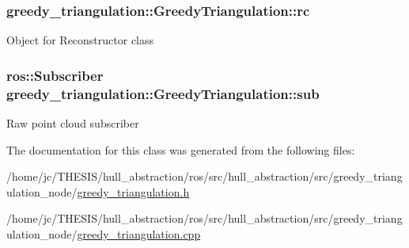 \subsubsection[{\texorpdfstring{rc}{rc}}]{ greedy\+\_\+triangulation\+::\+Greedy\+Triangulation\+::rc\hspace{0.3cm}{\ttfamily [private]}}\hypertarget{classgreedy__triangulation_1_1_greedy_triangulation_a69a1c245b9985fe03482884cf54b851d}{}\label{classgreedy__triangulation_1_1_greedy_triangulation_a69a1c245b9985fe03482884cf54b851d}
Object for Reconstructor class 
\subsubsection[{\texorpdfstring{sub}{sub}}]{\setlength{\rightskip}{0pt plus 5cm}ros\+::\+Subscriber greedy\+\_\+triangulation\+::\+Greedy\+Triangulation\+::sub\hspace{0.3cm}{\ttfamily [private]}}\hypertarget{classgreedy__triangulation_1_1_greedy_triangulation_afb3a088f4a5b177363eae83a1187ed58}{}\label{classgreedy__triangulation_1_1_greedy_triangulation_afb3a088f4a5b177363eae83a1187ed58}
Raw point cloud subscriber 

The documentation for this class was generated from the following files\+:\begin{DoxyCompactItemize}
\item 
/home/jc/\+T\+H\+E\+S\+I\+S/hull\+\_\+abstraction/ros/src/hull\+\_\+abstraction/src/greedy\+\_\+triangulation\+\_\+node/\hyperlink{greedy__triangulation_8h}{greedy\+\_\+triangulation.\+h}\item 
/home/jc/\+T\+H\+E\+S\+I\+S/hull\+\_\+abstraction/ros/src/hull\+\_\+abstraction/src/greedy\+\_\+triangulation\+\_\+node/\hyperlink{greedy__triangulation_8cpp}{greedy\+\_\+triangulation.\+cpp}\end{DoxyCompactItemize}
